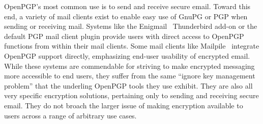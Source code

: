 OpenPGP's most common use is to send and receive secure email. Toward
this end, a variety of mail clients exist to enable easy use of GnuPG
or PGP when sending or receiving mail. Systems like the
Enigmail~\cite{enigmail} Thunderbird add-on or the default PGP mail
client plugin provide users with direct access to OpenPGP functions
from within their mail clients. Some mail clients like
Mailpile~\cite{mailpile} integrate OpenPGP support directly,
emphasizing end-user usability of encrypted email. While these systems
are commendable for striving to make encrypted messaging more
accessible to end users, they suffer from the same ``ignore key
management problem'' that the underling OpenPGP tools they use
exhibit. They are also all very specific encryption solutions,
pertaining only to sending and receiving secure email. They do not
broach the larger issue of making encryption available to users across
a range of arbitrary use cases.


